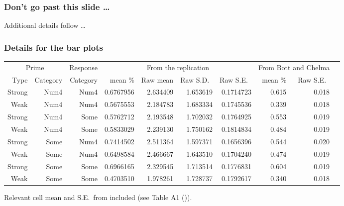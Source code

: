 \documentclass[noamssymb]{beamer}
\begin{document}
\appendix


\begin{frame}
  \frametitle{{\ftf Don't go past this slide \dots}}

  Additional details follow \dots
\end{frame}

\begin{frame}
  \frametitle{{\ftf Details for the bar plots}}

\begin{adjustbox}{width=1\textwidth,center=\textwidth}
    \begin{tabular}{rrrrrrrrrr}
      \hline
      \multicolumn{2}{c}{Prime} & Response & \multicolumn{4}{c}{From the replication} & \multicolumn{2}{c}{From Bott and Chelma} \\
      \cline{1-3}
      Type & Category & Category  & mean \% & Raw mean & Raw S.D.\ & Raw S.E.\ &  mean \%  & Raw S.E.\  \\
      \hline
      Strong & Num4 &  Num4 &   0.6767956 &  2.634409 & 1.653619 & 0.1714723  & 0.615 & 0.018   \\
      Weak & Num4 &  Num4 &   0.5675553 &  2.184783 & 1.683334 & 0.1745536  & 0.339 & 0.018    \\
      Strong & Num4 &  Some &   0.5762712 &  2.193548 & 1.702032 & 0.1764925  & 0.553 & 0.019    \\
      Weak & Num4 &  Some &   0.5833029 &  2.239130 & 1.750162 & 0.1814834  & 0.484 & 0.019    \\
      Strong & Some &  Num4 &   0.7414502 &  2.511364 & 1.597371 & 0.1656396  & 0.544 & 0.020    \\
      Weak & Some &  Num4 &   0.6498584 &  2.466667 & 1.643510 & 0.1704240  & 0.474 & 0.019    \\
      Strong & Some &  Some &   0.6966165 &  2.329545 & 1.713514 & 0.1776831  & 0.604 & 0.019    \\
      Weak & Some &  Some &   0.4703510 &  1.978261 & 1.728737 & 0.1792617 & 0.340 & 0.018     \\
      \hline
    \end{tabular}
  \end{adjustbox}
  Relevant cell mean and S.E.\ from \citeauthor{Bott:2016aa} included (see Table A1 (\citeyear[138--139]{Bott:2016aa})).
\end{frame}
\end{document}
